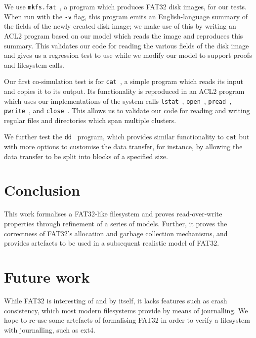 \documentclass[submission,copyright,creativecommons]{eptcs}
\begin{document}
We use \texttt{mkfs.fat}~\cite{hudsonmkfs}, a program which produces
FAT32 disk images, for our tests. When run with the \texttt{-v} flag,
this program emits an English-language summary of the fields of the
newly created disk image; we make use of this by writing an ACL2
program based on our model which reads the image and reproduces this
summary. This validates our code for reading the various fields of the
disk image and gives us a regression test to use while we modify our
model to support proofs and filesystem calls.

Our first co-simulation test is for \texttt{cat}~\cite{granlundcat}, a
simple program which reads its input and copies it to its output. Its
functionality is reproduced in an ACL2 program which uses our
implementations of the system calls
\texttt{lstat}~\cite{kerrisklstat},
\texttt{open}~\cite{kerriskopen}, \texttt{pread}~\cite{kerriskpread},
\texttt{pwrite}~\cite{kerriskpwrite}, and
\texttt{close}~\cite{kerriskclose}. This allows us to validate our
code for reading and writing regular files and directories which span
multiple clusters.

We further test the \texttt{dd}~\cite{rubindd} program, which provides
similar functionality to \texttt{cat} but with more options to
customise the data transfer, for instance, by allowing the data
transfer to be split into blocks of a specified size.

\section{Conclusion}

This work formalises a FAT32-like filesystem and proves
read-over-write properties through refinement of a series of
models. Further, it proves the correctness of FAT32's allocation and
garbage collection mechanisms, and provides artefacts to be used in a
subsequent realistic model of FAT32.

\section{Future work}

While FAT32 is interesting of and by itself, it lacks features such as
crash consistency, which most modern filesystems provide by means of
journalling. We hope to re-use some artefacts of formalising FAT32 in
order to verify a filesystem with journalling, such as ext4.
\end{document}
